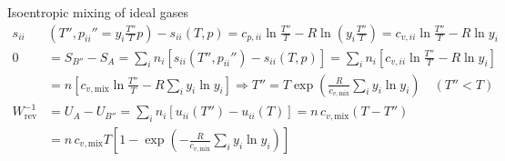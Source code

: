 \begin{example}
    Isoentropic mixing of ideal gases
    \begin{align*}
        s_{ii}&\left(T'', p_{ii}'' = y_i \frac{T''}{T} p \right) - s_{ii}(T, p) 
        = c_{p,ii} \ln \frac{T''}{T} - R \ln \left( y_i \frac{T''}{T} \right)
        = c_{v,ii} \ln \frac{T''}{T} - R \ln y_i\\
        0 &= S_{B''} - S_A 
        = \sum_i n_i [s_{ii}(T'', p_{ii}'') - s_{ii}(T, p)] 
        = \sum_i n_i \left[c_{v,ii} \ln \frac{T''}{T} - R \ln y_i\right] \\
        &= n \left[c_{v,\mathrm{mix}} \ln \frac{T''}{T} 
        - R \sum_i y_i \ln y_i\right]\Rightarrow
T'' = T \exp \left( \frac{R}{c_{v,\mathrm{mix}}} 
\sum_i y_i \ln y_i \right)\quad (T'' < T) \\
    W_{\text{rev}}^{-1} &= U_A - U_{B''} 
    = \sum_i n_i [u_{ii}(T'') - u_{ii}(T)] 
    = n \, c_{v,\mathrm{mix}} (T - T'') \\
    &= n \, c_{v,\mathrm{mix}} T \left[ 1 - \exp 
    \left( -\frac{R}{c_{v,\mathrm{mix}}} \sum_i y_i \ln y_i \right) \right]
    \end{align*}
\end{example}

















\ifx\allfiles\undefined

\fi
